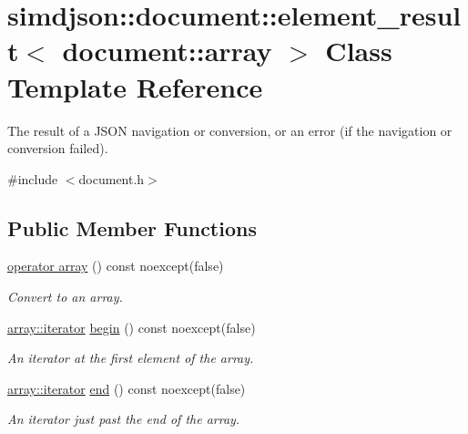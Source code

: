 \hypertarget{classsimdjson_1_1document_1_1element__result_3_01document_1_1array_01_4}{}\section{simdjson\+:\+:document\+:\+:element\+\_\+result$<$ document\+:\+:array $>$ Class Template Reference}
\label{classsimdjson_1_1document_1_1element__result_3_01document_1_1array_01_4}


The result of a J\+S\+ON navigation or conversion, or an error (if the navigation or conversion failed).  




{\ttfamily \#include $<$document.\+h$>$}

\subsection*{Public Member Functions}
\begin{DoxyCompactItemize}
\item 
\hyperlink{classsimdjson_1_1document_1_1element__result_3_01document_1_1array_01_4_a427bcc2cd2ca7bf233e10418d62c6082}{operator array} () const noexcept(false)
\begin{DoxyCompactList}\small\item\em Convert to an array. \end{DoxyCompactList}\item 
\hyperlink{classsimdjson_1_1document_1_1array_1_1iterator}{array\+::iterator} \hyperlink{classsimdjson_1_1document_1_1element__result_3_01document_1_1array_01_4_a3a97675726baee86118f283d5e2d4941}{begin} () const noexcept(false)
\begin{DoxyCompactList}\small\item\em An iterator at the first element of the array. \end{DoxyCompactList}\item 
\hyperlink{classsimdjson_1_1document_1_1array_1_1iterator}{array\+::iterator} \hyperlink{classsimdjson_1_1document_1_1element__result_3_01document_1_1array_01_4_a2a75b9c1ab622bbf3e9d5ee063a6c018}{end} () const noexcept(false)
\begin{DoxyCompactList}\small\item\em An iterator just past the end of the array. \end{DoxyCompactList}\end{DoxyCompactItemize}
